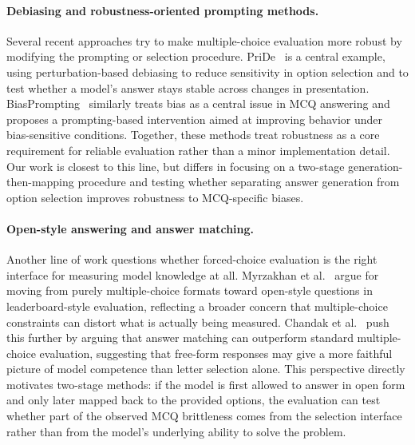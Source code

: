 \documentclass{article}
\begin{document}
\paragraph{Debiasing and robustness-oriented prompting methods.}
Several recent approaches try to make multiple-choice evaluation more robust by modifying the prompting or selection procedure. PriDe~\cite{zheng2023large} is a central example, using perturbation-based debiasing to reduce sensitivity in option selection and to test whether a model's answer stays stable across changes in presentation. BiasPrompting~\cite{vu2025biasprompting} similarly treats bias as a central issue in MCQ answering and proposes a prompting-based intervention aimed at improving behavior under bias-sensitive conditions. Together, these methods treat robustness as a core requirement for reliable evaluation rather than a minor implementation detail. Our work is closest to this line, but differs in focusing on a two-stage generation-then-mapping procedure and testing whether separating answer generation from option selection improves robustness to MCQ-specific biases.
 
\paragraph{Open-style answering and answer matching.}
Another line of work questions whether forced-choice evaluation is the right interface for measuring model knowledge at all. Myrzakhan et al.~\cite{myrzakhan2024open} argue for moving from purely multiple-choice formats toward open-style questions in leaderboard-style evaluation, reflecting a broader concern that multiple-choice constraints can distort what is actually being measured. Chandak et al.~\cite{chandak2025answer} push this further by arguing that answer matching can outperform standard multiple-choice evaluation, suggesting that free-form responses may give a more faithful picture of model competence than letter selection alone. This perspective directly motivates two-stage methods: if the model is first allowed to answer in open form and only later mapped back to the provided options, the evaluation can test whether part of the observed MCQ brittleness comes from the selection interface rather than from the model's underlying ability to solve the problem.
 
\end{document}
